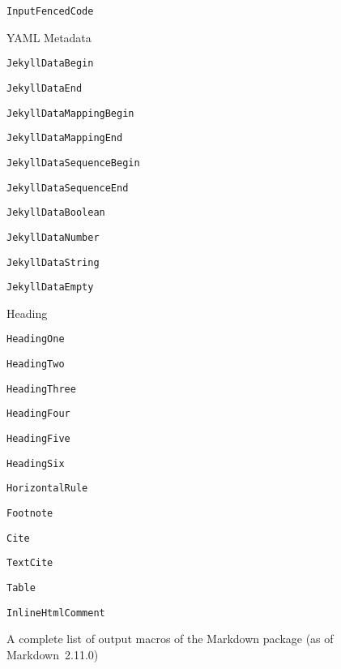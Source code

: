 \documentclass[
  digital,     %
  oneside,     %
  nosansbold,  %
  nocolorbold, %
  lof,         %
  nolot,       %
]{fithesis4}
\begin{document}
\begin{figure}
\begin{multicols}{2}
\begin{compactenum}
\begin{compactenum}
        \item \texttt{InputFencedCode}
      \end{compactenum}
      \item YAML Metadata
      \begin{compactenum}  %
        \item \texttt{JekyllDataBegin}
        \item \texttt{JekyllDataEnd}
        \item \texttt{JekyllDataMappingBegin}
        \item \texttt{JekyllDataMappingEnd}
        \item \texttt{JekyllDataSequenceBegin}
        \item \texttt{JekyllDataSequenceEnd}
        \item \texttt{JekyllDataBoolean}
        \item \texttt{JekyllDataNumber}
        \item \texttt{JekyllDataString}
        \item \texttt{JekyllDataEmpty}
      \end{compactenum}
      \item Heading
      \begin{compactenum}
        \item \texttt{HeadingOne}
        \item \texttt{HeadingTwo}
        \item \texttt{HeadingThree}
        \item \texttt{HeadingFour}
        \item \texttt{HeadingFive}
        \item \texttt{HeadingSix}
      \end{compactenum}
      \item \texttt{HorizontalRule}
      \item \texttt{Footnote}
      \item \texttt{Cite}
      \item \texttt{TextCite}
      \item \texttt{Table}
      \item \texttt{InlineHtmlComment}
    \end{compactenum}
  \end{multicols}
  \vspace*{-1em}
  \caption{A complete list of output macros of the Markdown package (as of Markdown~2.11.0)}
  \label{fig:markdown-macros}
\end{figure}
\end{document}
